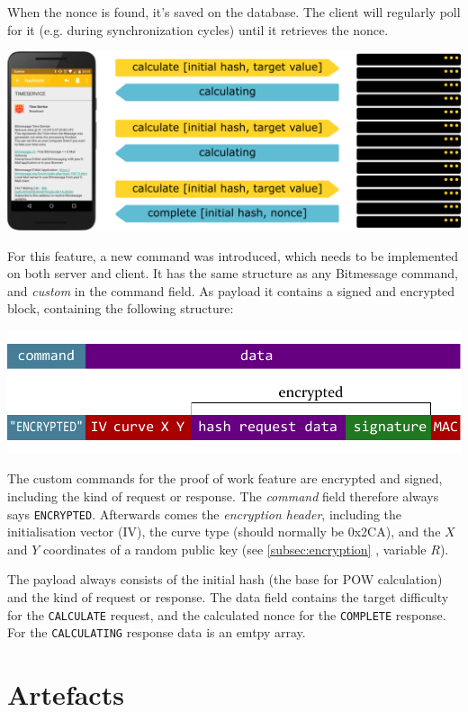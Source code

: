 \documentclass{bfh}
\begin{document}
  When the nonce is found, it's saved on the database. The client will regularly poll for it (e.g. during synchronization cycles) until it retrieves the nonce.

  \includegraphics[width=\textwidth]{images/server_pow_protocol.pdf}

  For this feature, a new command was introduced, which needs to be implemented on both server and client. It has the same structure as any Bitmessage command, and \textit{custom} in the command field. As payload it contains a signed and encrypted block, containing the following structure:

  \includegraphics[width=\textwidth]{images/custom_message.pdf}

  The custom commands for the proof of work feature are encrypted and signed, including the kind of request or response. The \textit{command} field therefore always says \texttt{ENCRYPTED}. Afterwards comes the \textit{encryption header}, including the initialisation vector (IV), the curve type (should normally be 0x2CA), and the $X$ and $Y$ coordinates of a random public key (see \ref{subsec:encryption} , variable $R$).

  The payload always consists of the initial hash (the base for \ac{POW} calculation) and the kind of request or response. The data field contains the target difficulty for the \texttt{CALCULATE} request, and the calculated nonce for the \texttt{COMPLETE} response. For the \texttt{CALCULATING} response data is an emtpy array.


  \newpage
  \section{Artefacts}
\end{document}
